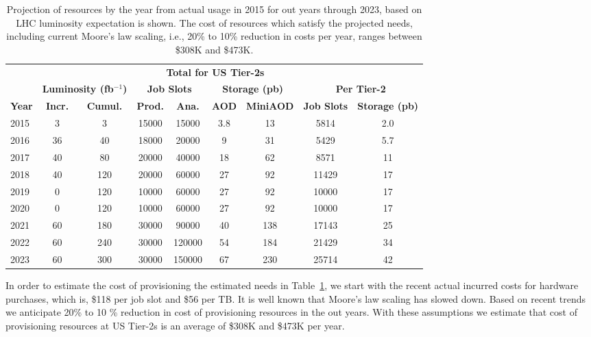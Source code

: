 \documentclass[11pt,a4paper]{article}
\begin{document}
\begin{table}
\begin{center}
\begin{tabular}{|l|c|c|c|c|c|c|c|c|}
\hline
&\multicolumn{2}{|c|}{ } &\multicolumn{4}{|c|}{\bf Total for US Tier-2s}&\multicolumn{2}{|c|}{ } \\ \cline{4-7}
&\multicolumn{2}{|c|}{\bf Luminosity (fb$^{-1}$)}&\multicolumn{2}{|c|}{\bf Job Slots}&\multicolumn{2}{|c|}{\bf Storage (pb)}&\multicolumn{2}{|c|}{\bf Per Tier-2} \\ \cline{2-9}
{\bf Year}&{\bf Incr.}&{\bf Cumul.}&{\bf Prod.}&{\bf Ana.}&{\bf AOD}&{\bf MiniAOD}&{\bf Job Slots}&{\bf Storage (pb)} \\  \hline
2015&    3&   3& 15000&   15000& 3.8&  13&   5814&   2.0 \\ \hline
2016&   36&  40& 18000&   20000&   9&  31&   5429&   5.7 \\ \hline
2017&   40&  80& 20000&   40000&  18&  62&   8571&    11 \\ \hline
2018&   40& 120& 20000&   60000&  27&  92&  11429&    17 \\ \hline
2019&    0& 120& 10000&   60000&  27&  92&  10000&    17 \\ \hline
2020&    0& 120& 10000&   60000&  27&  92&  10000&    17 \\ \hline
2021&   60& 180& 30000&   90000&  40& 138&  17143&    25 \\ \hline
2022&   60& 240& 30000&  120000&  54& 184&  21429&    34 \\ \hline
2023&   60& 300& 30000&  150000&  67& 230&  25714&    42 \\ \hline
\end{tabular}
\caption[]
{
Projection of resources by the year from actual usage in 2015 for
out years through 2023, based on LHC luminosity expectation is
shown. The cost of resources which satisfy the projected needs, 
including current Moore's law scaling, i.e., 20\% to 10\% reduction 
in costs per year, ranges between \$308K and \$473K.
}
\label{projection}
\end{center}
\end{table}

In order to estimate the cost of provisioning the estimated needs in
Table~\ref{projection}, we start with the recent actual incurred costs 
for hardware purchases, which is, \$118 per job slot and \$56 per TB.
It is well known that Moore's law scaling has slowed down.  Based
on recent trends we anticipate 20\% to 10 \% reduction in cost of
provisioning resources in the out years.  With these assumptions
we estimate that cost of provisioning resources at US Tier-2s
is an average of \$308K and \$473K per year. 
\end{document}

